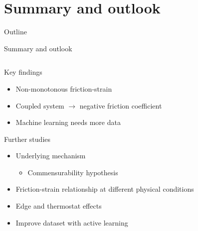\documentclass[
	10pt, %
]{beamer}
\begin{document}
\section{Summary and outlook} %
\begin{frame}{Outline}
    \tableofcontents[currentsection]
\end{frame}


\begin{frame}{Summary and outlook}


	\begin{columns} 
		\begin{column}{.5\textwidth}
			Key findings		
			\begin{itemize}
				\item Non-monotonous friction-strain
				\item Coupled system $\to$ negative friction coefficient
				\item Machine learning needs more data
			\end{itemize}
			\vspace*{5mm}
			Further studies
			\begin{itemize}
				\item Underlying mechanism
				\begin{itemize}
					\item Commensurability hypothesis
				\end{itemize}
				\item Friction-strain relationship at different physical conditions
				\item Edge and thermostat effects
				\item Improve dataset with active learning 
			\end{itemize}
		\end{column}
		\begin{column}{.5\textwidth}


\end{column}
\end{columns}
\end{frame}
\end{document}
